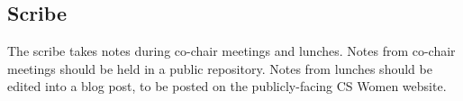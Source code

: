\subsection{Scribe}
\label{sec:scribe}
The scribe takes notes during co-chair meetings and lunches. Notes from co-chair meetings should be held in a public repository. Notes from lunches should be edited into a blog post, to be posted on the publicly-facing CS Women website. 
